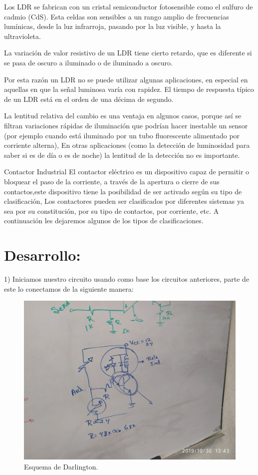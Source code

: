 \documentclass[14pt,letterpaper]{article}
\begin{document}
Los LDR se fabrican con un cristal semiconductor fotosensible como el sulfuro de cadmio (CdS). Esta celdas son sensibles a un rango amplio de frecuencias lumínicas, desde la luz infrarroja, pasando por la luz visible, y hasta la ultravioleta.

La variación de valor resistivo de un LDR tiene cierto retardo, que es diferente si se pasa de oscuro a iluminado o de iluminado a oscuro.

Por esta razón un LDR no se puede utilizar algunas aplicaciones, en especial en aquellas en que la señal luminosa varía con rapidez. El tiempo de respuesta típico de un LDR está en el orden de una décima de segundo.

La lentitud relativa del cambio es una ventaja en algunos casos, porque así se filtran variaciones rápidas de iluminación que podrían hacer inestable un sensor (por ejemplo cuando está iluminado por un tubo fluorescente alimentado por corriente alterna), En otras aplicaciones (como la detección de luminosidad para saber si es de día o es de noche) la lentitud de la detección no es importante.

Contactor Industrial
El contactor eléctrico es  un dispositivo capaz de permitir o bloquear el paso de la corriente, a través de la apertura o cierre de sus contactos,este dispositivo tiene la posibilidad de ser activado según su tipo de clasificación, Los contactores pueden ser clasificados por diferentes sistemas ya sea por su constitución, por su tipo de contactos, por corriente, etc. A continuación les dejaremos algunos de los tipos de clasificaciones.

\section{Desarrollo:}
1)	Iniciamos nuestro circuito usando como base los circuitos anteriores, parte de este lo conectamos de la siguiente manera:
\
\begin{figure}[h!]
\begin{center}
\includegraphics[scale=0.2]{EsquemaDarlington.jpg}  
\caption{Esquema de Darlington.}
\end{center}
\end{figure}
\end{document}
